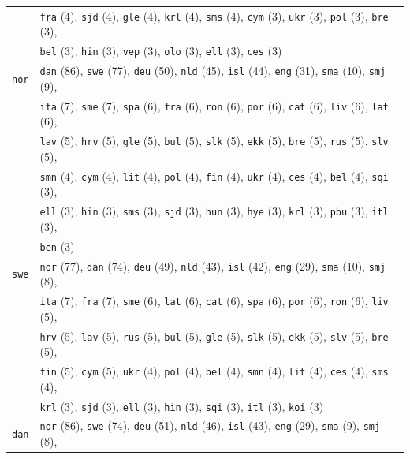 \begin{center}
\begin{longtable}{ll}
 & \texttt{fra} (4), \texttt{sjd} (4), \texttt{gle} (4), \texttt{krl} (4), \texttt{sms} (4), \texttt{cym} (3), \texttt{ukr} (3), \texttt{pol} (3), \texttt{bre} (3),\\
 & \texttt{bel} (3), \texttt{hin} (3), \texttt{vep} (3), \texttt{olo} (3), \texttt{ell} (3), \texttt{ces} (3) \\
\texttt{nor} & \texttt{dan} (86), \texttt{swe} (77), \texttt{deu} (50), \texttt{nld} (45), \texttt{isl} (44), \texttt{eng} (31), \texttt{sma} (10), \texttt{smj} (9),\\
 & \texttt{ita} (7), \texttt{sme} (7), \texttt{spa} (6), \texttt{fra} (6), \texttt{ron} (6), \texttt{por} (6), \texttt{cat} (6), \texttt{liv} (6), \texttt{lat} (6),\\
 & \texttt{lav} (5), \texttt{hrv} (5), \texttt{gle} (5), \texttt{bul} (5), \texttt{slk} (5), \texttt{ekk} (5), \texttt{bre} (5), \texttt{rus} (5), \texttt{slv} (5),\\
 & \texttt{smn} (4), \texttt{cym} (4), \texttt{lit} (4), \texttt{pol} (4), \texttt{fin} (4), \texttt{ukr} (4), \texttt{ces} (4), \texttt{bel} (4), \texttt{sqi} (3),\\
 & \texttt{ell} (3), \texttt{hin} (3), \texttt{sms} (3), \texttt{sjd} (3), \texttt{hun} (3), \texttt{hye} (3), \texttt{krl} (3), \texttt{pbu} (3), \texttt{itl} (3),\\
 & \texttt{ben} (3) \\
\texttt{swe} & \texttt{nor} (77), \texttt{dan} (74), \texttt{deu} (49), \texttt{nld} (43), \texttt{isl} (42), \texttt{eng} (29), \texttt{sma} (10), \texttt{smj} (8),\\
 & \texttt{ita} (7), \texttt{fra} (7), \texttt{sme} (6), \texttt{lat} (6), \texttt{cat} (6), \texttt{spa} (6), \texttt{por} (6), \texttt{ron} (6), \texttt{liv} (5),\\
 & \texttt{hrv} (5), \texttt{lav} (5), \texttt{rus} (5), \texttt{bul} (5), \texttt{gle} (5), \texttt{slk} (5), \texttt{ekk} (5), \texttt{slv} (5), \texttt{bre} (5),\\
 & \texttt{fin} (5), \texttt{cym} (5), \texttt{ukr} (4), \texttt{pol} (4), \texttt{bel} (4), \texttt{smn} (4), \texttt{lit} (4), \texttt{ces} (4), \texttt{sms} (4),\\
 & \texttt{krl} (3), \texttt{sjd} (3), \texttt{ell} (3), \texttt{hin} (3), \texttt{sqi} (3), \texttt{itl} (3), \texttt{koi} (3) \\
\texttt{dan} & \texttt{nor} (86), \texttt{swe} (74), \texttt{deu} (51), \texttt{nld} (46), \texttt{isl} (43), \texttt{eng} (29), \texttt{sma} (9), \texttt{smj} (8),\\

\end{longtable}
\end{center}
